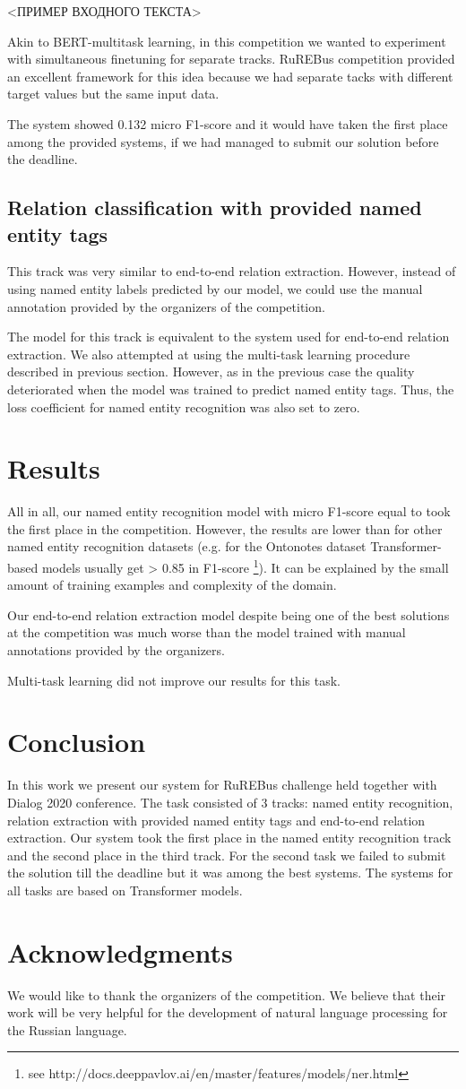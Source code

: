 \documentclass{dialogue}
\begin{document}
<ПРИМЕР ВХОДНОГО ТЕКСТА>

Akin to BERT-multitask learning, in this competition we wanted to experiment with simultaneous finetuning for separate tracks. RuREBus competition provided an excellent framework for this idea because we had separate tacks with different target values but the same input data.


The system showed 0.132 micro F1-score and it would have taken the first place among the provided systems, if we had managed to submit our solution before the deadline.

\subsection{Relation classification with provided named entity tags}
This track was very similar to end-to-end relation extraction. However, instead of using named entity labels predicted by our model, we could use the manual annotation provided by the organizers of the competition.

The model for this track is equivalent to the system used for end-to-end relation extraction. We also attempted at using the multi-task learning procedure described in previous section. However, as in the previous case the quality deteriorated when the model was trained to predict named entity tags. Thus, the loss coefficient for named entity recognition was also set to zero.
\section{Results}
All in all, our named entity recognition model with micro F1-score equal to took the first place in the competition. However, the results are lower than for other named entity recognition datasets (e.g. for the Ontonotes dataset Transformer-based models usually get > 0.85 in F1-score \footnote{see http://docs.deeppavlov.ai/en/master/features/models/ner.html}). It can be explained by the small amount of training examples and complexity of the domain.

Our end-to-end relation extraction model despite being one of the best solutions at the competition was much worse than the model trained with manual annotations provided by the organizers. 

Multi-task learning did not improve our results for this task.
\section{Conclusion}
In this work we present our system for RuREBus challenge held together with Dialog 2020 conference. The task consisted of 3 tracks: named entity recognition, relation extraction with provided named entity tags and end-to-end relation extraction. Our system took the first place in the named entity recognition track and the second place in the third track. For the second task we failed to submit the solution till the deadline but it was among the best systems. The systems for all tasks are based on Transformer models.

\section{Acknowledgments}
We would like to thank the organizers of the competition. We believe that their work will be very helpful for the development of natural language processing for the Russian language.

\end{document}
